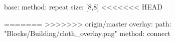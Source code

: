base:
  method: repeat
  size: [8,8]
<<<<<<< HEAD

=======
>>>>>>> origin/master
overlay:
  path: "Blocks/Building/cloth_overlay.png"
  method: connect
